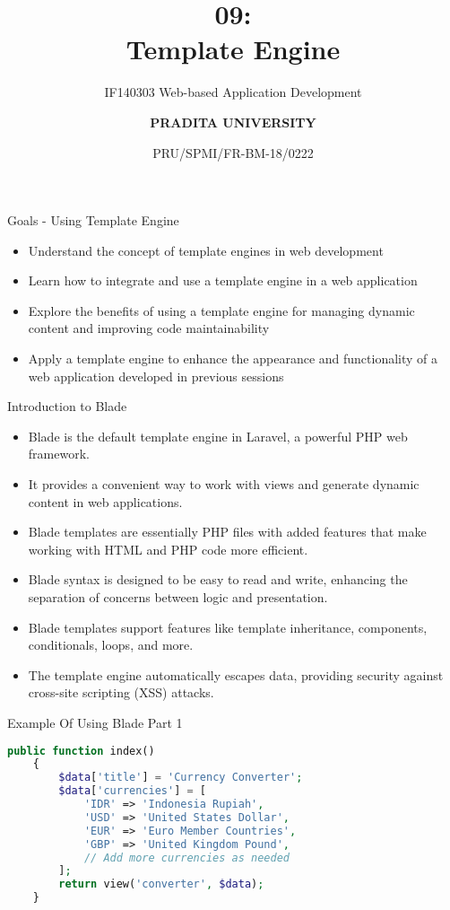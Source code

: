 \documentclass[aspectratio=169, table]{beamer}
\subtitle{IF140303 Web-based Application Development}
\title{\Huge {\textbf{09: \\Template Engine}}}
\date[Serial]{\scriptsize {PRU/SPMI/FR-BM-18/0222}}
\author[Pradita]{\small {\textbf{PRADITA UNIVERSITY}}}
\begin{document}
\begin{frame}
    \titlepage
\end{frame}

\begin{frame}{Goals - Using Template Engine}
\begin{itemize}
	\item Understand the concept of template engines in web development
	\item Learn how to integrate and use a template engine in a web application
	\item Explore the benefits of using a template engine for managing dynamic content and improving code maintainability
	\item Apply a template engine to enhance the appearance and functionality of a web application developed in previous sessions
\end{itemize}
\end{frame}

\begin{frame}{Introduction to Blade}
\vskip1cm
\begin{itemize}
	\item Blade is the default template engine in Laravel, a powerful PHP web framework.
	\item It provides a convenient way to work with views and generate dynamic content in web applications.
	\item Blade templates are essentially PHP files with added features that make working with HTML and PHP code more efficient.
	\item Blade syntax is designed to be easy to read and write, enhancing the separation of concerns between logic and presentation.
	\item Blade templates support features like template inheritance, components, conditionals, loops, and more.
	\item The template engine automatically escapes data, providing security against cross-site scripting (XSS) attacks.
\end{itemize}
\end{frame}

\begin{frame}[fragile]{Example Of Using Blade Part 1}
    \begin{lstlisting}[language=PHP]
    public function index()
    {
        $data['title'] = 'Currency Converter';
        $data['currencies'] = [
            'IDR' => 'Indonesia Rupiah',
            'USD' => 'United States Dollar',
            'EUR' => 'Euro Member Countries',
            'GBP' => 'United Kingdom Pound',
            // Add more currencies as needed
        ];
        return view('converter', $data);
    }
    \end{lstlisting}
\end{frame}
\end{document}
